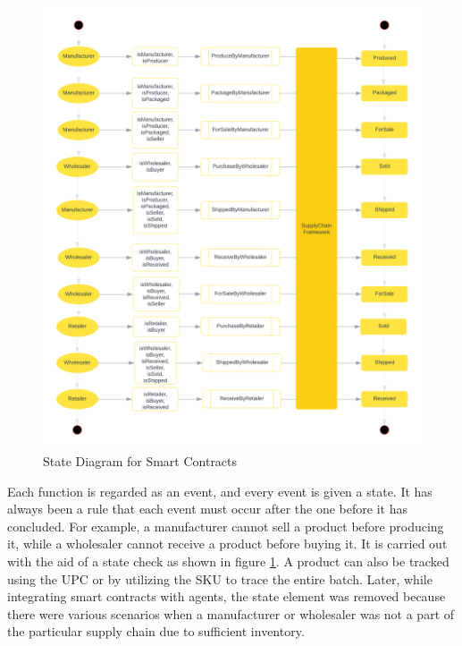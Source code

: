 \vspace{.5cm}

   \begin{figure}[h]
    \centering
      \includegraphics[width=12cm]{includes/figures/State diagram.png} 
      \caption{State Diagram for Smart Contracts}
      \label{State Diagram}
    \end{figure}

\vspace{.5cm}

Each function is regarded as an event, and every event is given a state. It has always been a rule that each event must occur after the one before it has concluded. For example, a manufacturer cannot sell a product before producing it, while a wholesaler cannot receive a product before buying it. It is carried out with the aid of a state check as shown in figure \ref{State Diagram}. A product can also be tracked using the \ac{UPC} or by utilizing the \ac{SKU} to trace the entire batch. Later, while integrating smart contracts with agents, the state element was removed because there were various scenarios when a manufacturer or wholesaler was not a part of the particular supply chain due to sufficient inventory.

\vspace{.5cm}

